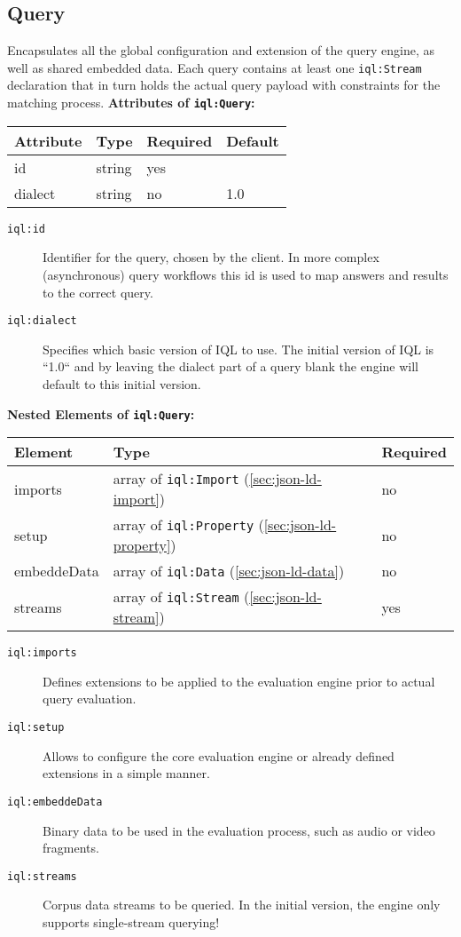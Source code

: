\documentclass[11pt,a4paper,portrait]{article}
\newcommand{\iql}{IQL\xspace}
\newcommand{\iqlns}{iql:}
\newcommand{\iqlType}[1]{\texttt{\iqlns#1}}
\newcommand{\desc}[1]{\noindent#1\newline\medskip}
\newenvironment{attributes}[1]{
\noindent\textbf{Attributes of #1:}\newline\medskip
\begin{tabular}{|p{0.3\textwidth}|p{0.20\textwidth}|p{0.20\textwidth}|p{0.17\textwidth}|}
	\hline
	\textbf{Attribute} & \textbf{Type} & \textbf{Required} & \textbf{Default} \\ 
	\hline
	\hline
}{
\end{tabular}
}
\newcommand{\attribute}[4]{
	#1 & #2 & #3 & #4 \\
	\hline
}
\newenvironment{elements}[1]{
\noindent\textbf{Nested Elements of #1:}\newline\medskip
\begin{tabular}{|p{0.3\textwidth}|p{0.42\textwidth}|p{0.17\textwidth}|}
	\hline
	\textbf{Element} & \textbf{Type} & \textbf{Required} \\ 
	\hline
	\hline
}{
\end{tabular}
}
\newcommand{\element}[3]{
#1 & #2 & #3 \\
\hline
}
\begin{document}
\subsection{Query}
\label{sec:json-ld-query}
\desc{Encapsulates all the global configuration and extension of the query engine, as well as shared embedded data. Each query contains at least one \iqlType{Stream} declaration that in turn holds the actual query payload with constraints for the matching process.}
\begin{attributes}{\iqlType{Query}}
	\attribute{id}{string}{yes}{}
	\attribute{dialect}{string}{no}{1.0}
\end{attributes}
\begin{description}
	\item[\iqlType{id}] Identifier for the query, chosen by the client. In more complex (asynchronous) query workflows this id is used to map answers and results to the correct query.
	\item[\iqlType{dialect}] Specifies which basic version of \iql to use. The initial version of \iql is ``1.0`` and by leaving the dialect part of a query blank the engine will default to this initial version.
\end{description}
\begin{elements}{\iqlType{Query}}
	\element{imports}{array of \iqlType{Import} (\ref{sec:json-ld-import})}{no}
	\element{setup}{array of \iqlType{Property} (\ref{sec:json-ld-property})}{no}
	\element{embeddeData}{array of \iqlType{Data} (\ref{sec:json-ld-data})}{no}
	\element{streams}{array of \iqlType{Stream} (\ref{sec:json-ld-stream})}{yes}
\end{elements}
\begin{description}
	\item[\iqlType{imports}] Defines extensions to be applied to the evaluation engine prior to actual query evaluation.
	\item[\iqlType{setup}] Allows to configure the core evaluation engine or already defined extensions in a simple manner.
	\item[\iqlType{embeddeData}] Binary data to be used in the evaluation process, such as audio or video fragments.
	\item[\iqlType{streams}] Corpus data streams to be queried. In the initial version, the engine only supports single-stream querying!
\end{description}
\end{document}
